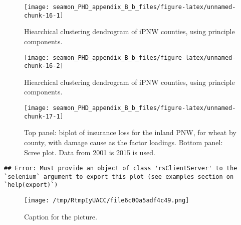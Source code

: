 \documentclass[]{article}
\begin{document}
\newpage

\begin{figure}

{\centering \texttt{[image: seamon\_PHD\_appendix\_B\_b\_files/figure-latex/unnamed-chunk-16-1]} 

}

\caption{Hiearchical clustering dendrogram of iPNW counties, using principle components.}\label{fig:unnamed-chunk-161}
\end{figure}
\begin{figure}

{\centering \texttt{[image: seamon\_PHD\_appendix\_B\_b\_files/figure-latex/unnamed-chunk-16-2]} 

}

\caption{Hiearchical clustering dendrogram of iPNW counties, using principle components.}\label{fig:unnamed-chunk-162}
\end{figure}

\begin{figure}

{\centering \texttt{[image: seamon\_PHD\_appendix\_B\_b\_files/figure-latex/unnamed-chunk-17-1]} 

}

\caption{Top panel: biplot of insurance loss for the inland PNW, for wheat by county, with damage cause as the factor loadings.  Bottom panel: Scree plot. Data from 2001 is 2015 is used.}\label{fig:unnamed-chunk-17}
\end{figure}

\begin{verbatim}
## Error: Must provide an object of class 'rsClientServer' to the `selenium` argument to export this plot (see examples section on `help(export)`)
\end{verbatim}

\begin{figure}
\centering
\texttt{[image: /tmp/RtmpIyUACC/file6c00a5adf4c49.png]}
\caption{Caption for the picture.}
\end{figure}
\end{document}
